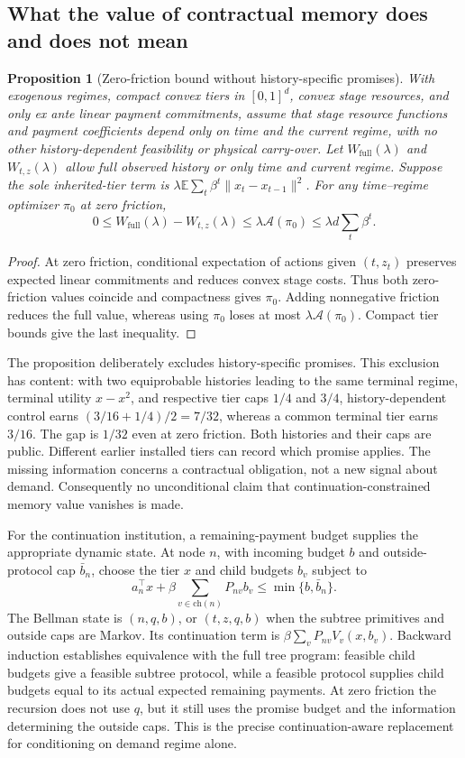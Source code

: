 \documentclass[11pt,letterpaper]{article}
\newtheorem{proposition}[theorem]{Proposition}
\theoremstyle{definition}
\newcommand{\E}{\mathbb E}
\newcommand{\1}{\mathbf 1}
\begin{document}
\subsection{What the value of contractual memory does and does not mean}
\begin{proposition}[Zero-friction bound without history-specific promises]\label{prop:r10-memory}
With exogenous regimes, compact convex tiers in $[0,1]^d$, convex stage resources, and only ex ante linear payment commitments, assume that stage resource functions and payment coefficients depend only on time and the current regime, with no other history-dependent feasibility or physical carry-over. Let $W_{\mathrm{full}}(\lambda)$ and $W_{t,z}(\lambda)$ allow full observed history or only time and current regime. Suppose the sole inherited-tier term is $\lambda\E\sum_t\beta^t\|x_t-x_{t-1}\|^2$. For any time--regime optimizer $\pi_0$ at zero friction,
\[
 0\leq W_{\mathrm{full}}(\lambda)-W_{t,z}(\lambda)
 \leq\lambda\mathcal A(\pi_0)\leq\lambda d\sum_t\beta^t.
\]
\end{proposition}
\begin{proof}
At zero friction, conditional expectation of actions given $(t,z_t)$ preserves expected linear commitments and reduces convex stage costs. Thus both zero-friction values coincide and compactness gives $\pi_0$. Adding nonnegative friction reduces the full value, whereas using $\pi_0$ loses at most $\lambda\mathcal A(\pi_0)$. Compact tier bounds give the last inequality.
\end{proof}
The proposition deliberately excludes history-specific promises. This exclusion has content: with two equiprobable histories leading to the same terminal regime, terminal utility $x-x^2$, and respective tier caps $1/4$ and $3/4$, history-dependent control earns $(3/16+1/4)/2=7/32$, whereas a common terminal tier earns $3/16$. The gap is $1/32$ even at zero friction. Both histories and their caps are public. Different earlier installed tiers can record which promise applies. The missing information concerns a contractual obligation, not a new signal about demand. Consequently no unconditional claim that continuation-constrained memory value vanishes is made.

For the continuation institution, a remaining-payment budget supplies the appropriate dynamic state. At node $n$, with incoming budget $b$ and outside-protocol cap $\bar b_n$, choose the tier $x$ and child budgets $b_v$ subject to
\begin{equation}\label{eq:r10-budget-dp}
 a_n^\top x+\beta\sum_{v\in\mathrm{ch}(n)}P_{nv}b_v\leq\min\{b,\bar b_n\}.
\end{equation}
The Bellman state is $(n,q,b)$, or $(t,z,q,b)$ when the subtree primitives and outside caps are Markov. Its continuation term is $\beta\sum_vP_{nv}V_v(x,b_v)$. Backward induction establishes equivalence with the full tree program: feasible child budgets give a feasible subtree protocol, while a feasible protocol supplies child budgets equal to its actual expected remaining payments. At zero friction the recursion does not use $q$, but it still uses the promise budget and the information determining the outside caps. This is the precise continuation-aware replacement for conditioning on demand regime alone.
\end{document}
